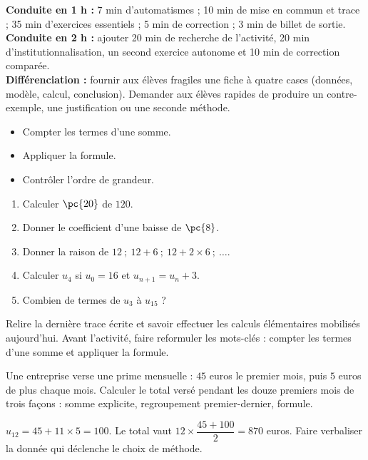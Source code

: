 \ifmxteacher
\begin{method}
\textbf{Conduite en 1 h :} 7 min d'automatismes ; 10 min de mise en commun et trace ; 35 min d'exercices essentiels ; 5 min de correction ; 3 min de billet de sortie.\\
\textbf{Conduite en 2 h :} ajouter 20 min de recherche de l'activité, 20 min d'institutionnalisation, un second exercice autonome et 10 min de correction comparée.\\
\textbf{Différenciation :} fournir aux élèves fragiles une fiche à quatre cases (données, modèle, calcul, conclusion). Demander aux élèves rapides de produire un contre-exemple, une justification ou une seconde méthode.
\end{method}
\fi
{}
\begin{objectives}\begin{itemize}\item Compter les termes d'une somme.\item Appliquer la formule.\item Contrôler l'ordre de grandeur.\end{itemize}\end{objectives}
\begin{fluency}\begin{enumerate}\item Calculer $\pc{20}$ de $120$. \item Donner le coefficient d'une baisse de $\pc{8}$. \item Donner la raison de $12\ ;\ 12+6\ ;\ 12+2\times6\ ;\ \ldots$. \item Calculer $u_4$ si $u_0=16$ et $u_{n+1}=u_n+3$. \item Combien de termes de $u_3$ à $u_{15}$ ? \end{enumerate}\end{fluency}
\begin{prerequisites}Relire la dernière trace écrite et savoir effectuer les calculs élémentaires mobilisés aujourd'hui. Avant l'activité, faire reformuler les mots-clés : compter les termes d'une somme et appliquer la formule.\end{prerequisites}

\begin{activity}
Une entreprise verse une prime mensuelle : $45$ euros le premier mois, puis $5$ euros de plus chaque mois. Calculer le total versé pendant les douze premiers mois de trois façons : somme explicite, regroupement premier-dernier, formule.

\end{activity}
\begin{solution}$u_{12}=45+11\times5=100$. Le total vaut $12\times\dfrac{45+100}{2}=870$ euros. Faire verbaliser la donnée qui déclenche le choix de méthode.\end{solution}

